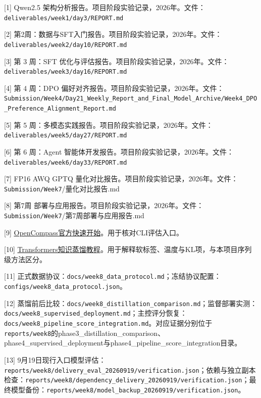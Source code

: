 \documentclass[UTF8,fontset=fandol,a4paper,11pt]{ctexart}
\begin{document}
{[}1{]} {Qwen2.5
架构分析报告}{。项目阶段实验记录，2026年。文件：\nolinkurl{deliverables/week1/day3/REPORT.md}}

{[}2{]}
{第2周：数据与SFT入门报告}{。项目阶段实验记录，2026年。文件：\nolinkurl{deliverables/week2/day10/REPORT.md}}

{[}3{]} {第 3 周：SFT
优化与评估报告}{。项目阶段实验记录，2026年。文件：\nolinkurl{deliverables/week3/day16/REPORT.md}}

{[}4{]} {第 4 周：DPO
偏好对齐报告}{。项目阶段实验记录，2026年。文件：\nolinkurl{Submission/Week4/Day21_Weekly_Report_and_Final_Model_Archive/Week4_DPO_Preference_Alignment_Report.md}}

{[}5{]} {第 5
周：多模态实践报告}{。项目阶段实验记录，2026年。文件：\nolinkurl{deliverables/week5/day27/REPORT.md}}

{[}6{]} {第 6 周：Agent
智能体开发报告}{。项目阶段实验记录，2026年。文件：\nolinkurl{deliverables/week6/day33/REPORT.md}}

{[}7{]} {FP16 AWQ GPTQ
量化对比报告}{。项目阶段实验记录，2026年。文件：\nolinkurl{Submission/Week7}/量化对比报告.md}

{[}8{]} {第7周
部署与应用报告}{。项目阶段实验记录，2026年。文件：\nolinkurl{Submission/Week7}/第7周部署与应用报告.md}

{[}9{]}
\href{https://opencompass.readthedocs.io/en/stable/get_started/quick_start.html}{OpenCompass官方快速开始}。用于核对CLI评估入口。

{[}10{]}
\href{https://huggingface.co/docs/transformers/v4.48.1/en/tasks/knowledge_distillation_for_image_classification}{Transformers知识蒸馏教程}。用于解释软标签、温度与KL项，与本项目序列级方法区分。

{[}11{]}
{正式数据协议：\nolinkurl{docs/week8_data_protocol.md}；冻结协议配置：\nolinkurl{configs/week8_data_protocol.json}。}

{[}12{]}
{蒸馏前后比较：\nolinkurl{docs/week8_distillation_comparison.md}；监督部署实测：\nolinkurl{docs/week8_supervised_deployment.md}；主控评分恢复：\nolinkurl{docs/week8_pipeline_score_integration.md}。对应证据分别位于\nolinkurl{reports/week8}的phase3\_distillation\_comparison、phase4\_supervised\_deployment与phase4\_pipeline\_score\_integration目录。}

{[}13{]}
{9月19日现行入口模型评估：\nolinkurl{reports/week8/delivery_eval_20260919/verification.json}；依赖与独立副本检查：\nolinkurl{reports/week8/dependency_delivery_20260919/verification.json}；最终模型备份：\nolinkurl{reports/week8/model_backup_20260919/verification.json}。}
\end{document}
